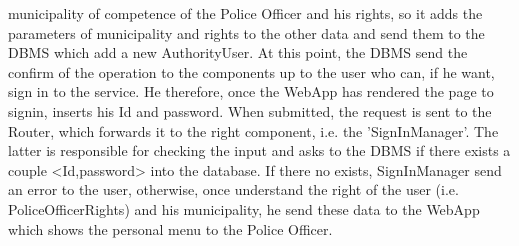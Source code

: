         municipality of competence of the Police Officer and his rights, so it
        adds the parameters of municipality and rights to the other data and
        send them to the DBMS which add a new AuthorityUser. At this point, the
        DBMS send the confirm of the operation to the components up to the user
        who can, if he want, sign in to the service. He therefore, once the
        WebApp has rendered the page to signin, inserts his Id and password.
        When submitted, the request is sent to the Router, which forwards it to
        the right component, i.e. the 'SignInManager'. The latter is responsible
        for checking the input and asks to the DBMS if there exists a couple
        <Id,password> into the database. If there no exists, SignInManager send
        an error to the user, otherwise, once understand the right of the user
        (i.e. PoliceOfficerRights) and his municipality, he send these data to
        the WebApp which shows the personal menu to the Police Officer. 


